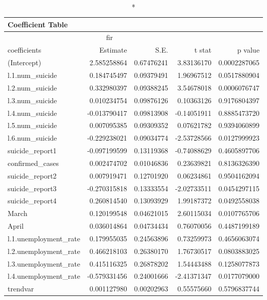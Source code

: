 \begin{longtable}{lrrrr}
\caption*{
{\large Coefficient Table}
} \\ 
\toprule
\multicolumn{4}{c}{fir} &  \\ 
\cmidrule(lr){1-4}
coefficients & Estimate & S.E. & t stat & p value \\ 
\midrule
(Intercept) & 2.585258864 & 0.67476241 & 3.83136170 & 0.0002287065 \\ 
l.1.num\_suicide & 0.184745497 & 0.09379491 & 1.96967512 & 0.0517880904 \\ 
l.2.num\_suicide & 0.332980397 & 0.09388245 & 3.54678018 & 0.0006076747 \\ 
l.3.num\_suicide & 0.010234754 & 0.09876126 & 0.10363126 & 0.9176804397 \\ 
l.4.num\_suicide & -0.013790417 & 0.09813908 & -0.14051911 & 0.8885473720 \\ 
l.5.num\_suicide & 0.007095385 & 0.09309352 & 0.07621782 & 0.9394060899 \\ 
l.6.num\_suicide & -0.229238021 & 0.09034774 & -2.53728566 & 0.0127999923 \\ 
suicide\_report1 & -0.097199599 & 0.13119368 & -0.74088629 & 0.4605897706 \\ 
confirmed\_cases & 0.002474702 & 0.01046836 & 0.23639821 & 0.8136326390 \\ 
suicide\_report2 & 0.007919471 & 0.12701920 & 0.06234861 & 0.9504162094 \\ 
suicide\_report3 & -0.270315818 & 0.13333554 & -2.02733511 & 0.0454297115 \\ 
suicide\_report4 & 0.260814540 & 0.13093929 & 1.99187372 & 0.0492558038 \\ 
March & 0.120199548 & 0.04621015 & 2.60115034 & 0.0107765706 \\ 
April & 0.036014864 & 0.04734434 & 0.76070056 & 0.4487199189 \\ 
l.1.unemployment\_rate & 0.179955035 & 0.24563896 & 0.73259973 & 0.4656063074 \\ 
l.2.unemployment\_rate & 0.466218103 & 0.26380170 & 1.76730517 & 0.0803883025 \\ 
l.3.unemployment\_rate & 0.415116325 & 0.26878202 & 1.54443488 & 0.1258077873 \\ 
l.4.unemployment\_rate & -0.579331456 & 0.24001666 & -2.41371347 & 0.0177079000 \\ 
trendvar & 0.001127980 & 0.00202963 & 0.55575660 & 0.5796837744 \\ 
\bottomrule
\end{longtable}

